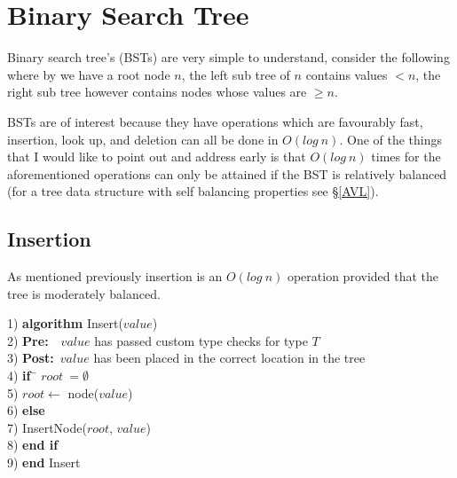 

\chapter{Binary Search Tree}
Binary search tree's (BSTs) are very simple to understand, consider the following where by we have a root node $n$, the left sub tree of $n$ contains values $< n$, the right sub tree however contains nodes whose values are $\geq n$.

BSTs are of interest because they have operations which are favourably fast, insertion, look up, and deletion can all be done in $O(log~n)$. One of the things that I would like to point out and address early is that $O(log~n)$ times for the aforementioned operations can only be attained if the BST is relatively balanced (for a tree data structure with self balancing properties see \S\ref{AVL}). 

\section{Insertion}
As mentioned previously insertion is an $O(log~n)$ operation provided that the tree is moderately balanced.

\begin{tabbing}
1)  \textbf{alg}\= \textbf{orithm} Insert($value$) \\
2)  \> \textbf{Pre:}~~$value$ has passed custom type checks for type $T$ \\
3)  \> \textbf{Post:}~$value$ has been placed in the correct location in the tree \\
4)  \> \textbf{if}~\= $root~= \emptyset$ \\
5)  \> \> $root \leftarrow$ node($value$) \\
6)  \> \textbf{else} \\
7)  \> \> InsertNode($root$, $value$) \\
8)  \> \textbf{end if} \\
9)  \textbf{end} Insert \\
\end{tabbing}

